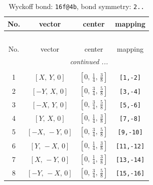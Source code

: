 \documentclass[fleqn,8pt]{jsarticle}
\begin{document}
\begin{longtable}{cccc}
\caption{Wyckoff bond: {\tt 16f@4b}, bond symmetry: {\tt 2..}}
 \\
 \hline \hline
No. & vector & center & mapping \\ \hline \endfirsthead

\multicolumn{3}{l}{\tablename\ \thetable{}} \\
 \hline \hline
No. & vector & center & mapping \\ \hline \endhead

 \hline \hline
\multicolumn{3}{r}{\footnotesize\it continued ...} \\ \endfoot

 \hline \hline
\multicolumn{3}{r}{} \\ \endlastfoot

1 & $\left[ X,\, Y,\, 0 \right]$ & $\left[ 0,\, \frac{1}{4},\, \frac{3}{8} \right]$ & {\tt [1,-2]} \\ \hline
2 & $\left[ - Y,\, X,\, 0 \right]$ & $\left[ 0,\, \frac{3}{4},\, \frac{5}{8} \right]$ & {\tt [3,-4]} \\ \hline
3 & $\left[ - X,\, Y,\, 0 \right]$ & $\left[ 0,\, \frac{3}{4},\, \frac{5}{8} \right]$ & {\tt [5,-6]} \\ \hline
4 & $\left[ Y,\, X,\, 0 \right]$ & $\left[ 0,\, \frac{1}{4},\, \frac{3}{8} \right]$ & {\tt [7,-8]} \\ \hline
5 & $\left[ - X,\, - Y,\, 0 \right]$ & $\left[ 0,\, \frac{3}{4},\, \frac{5}{8} \right]$ & {\tt [9,-10]} \\ \hline
6 & $\left[ Y,\, - X,\, 0 \right]$ & $\left[ 0,\, \frac{1}{4},\, \frac{3}{8} \right]$ & {\tt [11,-12]} \\ \hline
7 & $\left[ X,\, - Y,\, 0 \right]$ & $\left[ 0,\, \frac{1}{4},\, \frac{3}{8} \right]$ & {\tt [13,-14]} \\ \hline
8 & $\left[ - Y,\, - X,\, 0 \right]$ & $\left[ 0,\, \frac{3}{4},\, \frac{5}{8} \right]$ & {\tt [15,-16]} \\
\end{longtable}
\renewcommand{\arraystretch}{1.2}
\end{document}
